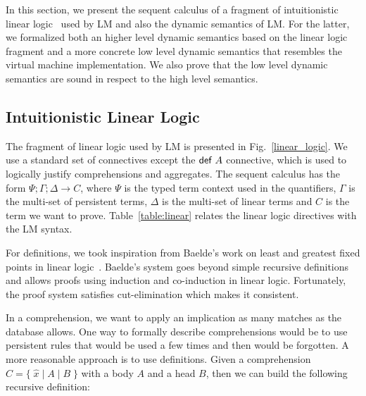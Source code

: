 \newcommand{\mz}{\m{match} \;}
\newcommand{\tab}[0]{\;\;\;\;}
\newcommand{\dz}{\m{derive} \;}
\newcommand{\comp}[0]{\m{comp} \;}
\newcommand{\az}{\m{apply} \;}
\newcommand{\doz}{\m{run} \;}
\newcommand{\seqnocut}[3]{#1 ; #2 \Rightarrow #3}
\newcommand{\defeq}{\buildrel\triangle\over =}
\newcommand{\compr}[1]{\m{def} \; #1}

\newcommand{\mo}{\m{match}_1 \;}
\newcommand{\cont}{\m{cont} \;}
\newcommand{\contc}{\m{contc} \;}
\newcommand{\done}{\m{derive}_1 \;}
\newcommand{\doo}{\m{run}_1 \;}
\newcommand{\mc}[0]{\m{match}_c \; }
\newcommand{\dall}[0]{\m{fix} \; }
\newcommand{\strans}[0]{\m{strans} \;}
\newcommand{\dc}{\m{derive}_c \;}
\newcommand{\ao}{\m{apply}_1 \;}

In this section, we present the sequent calculus of a fragment of intuitionistic linear logic~\cite{Girard95logic:its} used by LM and also the dynamic semantics of LM. For the latter, we formalized both an higher level dynamic semantics based on the linear logic fragment and a more concrete low level dynamic semantics that resembles the virtual machine implementation. We also prove that the low level dynamic semantics are sound in respect to the high level semantics. 

\subsection{Intuitionistic Linear Logic}

The fragment of linear logic used by LM is presented in Fig.~\ref{linear_logic}.
We use a standard set of connectives except the $\mathsf{def} \; A$ connective, which is used to logically justify comprehensions and aggregates.
The sequent calculus has the form $\Psi; \Gamma; \Delta \rightarrow C$, where $\Psi$ is the typed term context used in the quantifiers, $\Gamma$ is the multi-set
of persistent terms, $\Delta$ is the multi-set of linear terms and $C$ is the term we want to prove.
Table~\ref{table:linear} relates the linear logic directives with the LM syntax.

For definitions, we took inspiration from Baelde's work on least and greatest fixed points in linear logic~\cite{Baelde:2012:LGF:2071368.2071370}. Baelde's system goes beyond
simple recursive definitions and allows proofs using induction and co-induction in linear logic. Fortunately, the proof system satisfies cut-elimination which
makes it consistent.

In a comprehension, we want to apply an implication as many matches as the database allows. One way to formally describe comprehensions would be to use persistent
rules that would be used a few times and then would be forgotten. A more reasonable approach is to use
definitions. Given a comprehension $C = \{ \; \widehat{x} \; | \; A \; | \; B \; \}$ with a body $A$ and a head $B$, then we can build the following recursive definition:

